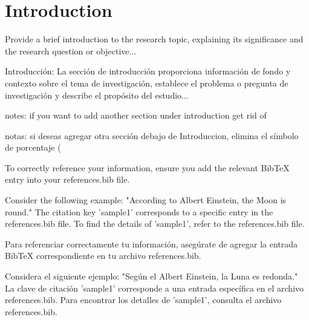 \section{Introduction}

Provide a brief introduction to the research topic, explaining its significance and the research question or objective...

Introducción: La sección de introducción proporciona información de fondo y contexto sobre el tema de investigación, establece el problema o pregunta de investigación y describe el propósito del estudio... 

notes: if you want to add another section under introduction  get rid of %

notas: si deseas agregar otra sección debajo de Introduccion, elimina el símbolo de porcentaje (%

To correctly reference your information, ensure you add the relevant BibTeX entry into your references.bib file.

Consider the following example: "According to Albert Einstein, the Moon is round\cite{sample1}." The citation key 'sample1' corresponds to a specific entry in the references.bib file. To find the details of 'sample1', refer to the references.bib file. 

Para referenciar correctamente tu información, asegúrate de agregar la entrada BibTeX correspondiente en tu archivo references.bib.

Considera el siguiente ejemplo: "Según el Albert Einstein, la Luna es redonda\cite{sample1}." La clave de citación 'sample1' corresponde a una entrada específica en el archivo references.bib. Para encontrar los detalles de 'sample1', consulta el archivo references.bib.

